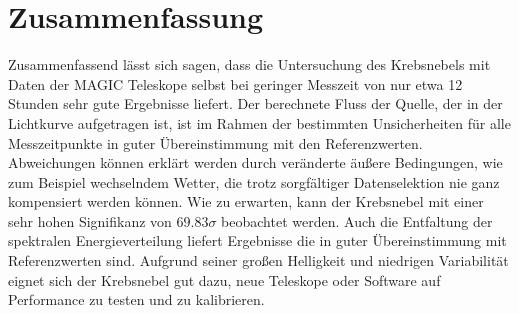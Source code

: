 \section{Zusammenfassung}
\label{sec:zusammenfassung}

Zusammenfassend lässt sich sagen, dass die Untersuchung des Krebsnebels mit Daten
der MAGIC Teleskope selbst bei geringer Messzeit von nur etwa 12 Stunden sehr gute
Ergebnisse liefert. Der berechnete Fluss der Quelle, der in der Lichtkurve
aufgetragen ist, ist im Rahmen der bestimmten Unsicherheiten für alle
Messzeitpunkte in guter Übereinstimmung mit den Referenzwerten. Abweichungen
können erklärt werden durch veränderte äußere Bedingungen, wie zum Beispiel
wechselndem Wetter, die trotz sorgfältiger Datenselektion nie ganz kompensiert
werden können. Wie zu erwarten, kann der Krebsnebel mit einer sehr hohen
Signifikanz von $\num{69.83}\sigma$ beobachtet werden. Auch die Entfaltung der
spektralen Energieverteilung liefert Ergebnisse die in guter Übereinstimmung mit
Referenzwerten sind. Aufgrund seiner großen Helligkeit und niedrigen
Variabilität eignet sich der Krebsnebel gut dazu, neue Teleskope oder Software
auf Performance zu testen und zu kalibrieren.

